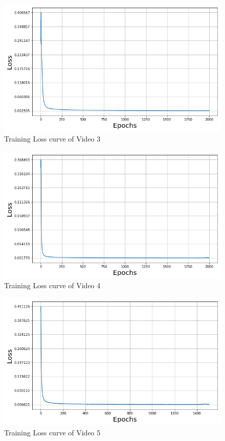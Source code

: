 \documentclass{ioereport}
\begin{document}
    \begin{figure}[H]
        \centering
        \includegraphics[width=\linewidth]{assets/video_loss_curves/short.png}
        \caption{Training Loss curve of Video 3}
        \label{fig:video-loss-curve-3}
    \end{figure}

    \begin{figure}[H]
        \centering
        \includegraphics[width=\linewidth]{assets/video_loss_curves/medium.png}
        \caption{Training Loss curve of Video 4}
        \label{fig:video-loss-curve-4}
    \end{figure}

    \begin{figure}[H]
        \centering
        \includegraphics[width=\linewidth]{assets/video_loss_curves/long.png}
        \caption{Training Loss curve of Video 5}
        \label{fig:video-loss-curve-5}
    \end{figure}
\end{document}
